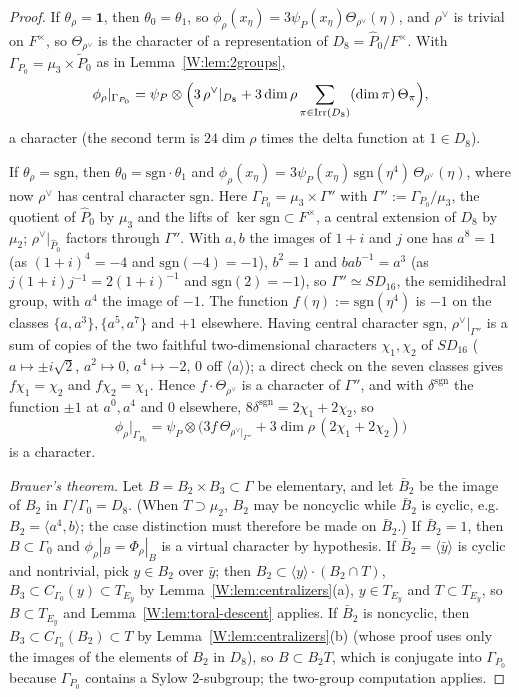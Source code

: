 \begin{proof}
If $\theta_\rho=\mathbf1$, then $\theta_0=\theta_1$, so
$\phi_\rho(x_\eta)=3\psi_P(x_\eta)\Theta_{\rho^\vee}(\eta)$, and
$\rho^\vee$ is trivial on $F^\times$, so $\Theta_{\rho^\vee}$ is the
character of a representation of $D_8=\hat P_0/F^\times$.  With
$\Gamma_{P_0}=\mu_3\times\tilde P_0$ as in Lemma~\ref{W:lem:2groups},
\[
 \phi_\rho|_{\Gamma_{P_0}}=\psi_P\otimes\Bigl(3\,\rho^\vee|_{D_8}+3\dim\rho\sum_{\pi\in\operatorname{Irr}(D_8)}(\dim\pi)\,\Theta_\pi\Bigr),
\]
a character (the second term is $24\dim\rho$ times the delta function at
$1\in D_8$).

If $\theta_\rho=\mathrm{sgn}$, then $\theta_0=\mathrm{sgn}\cdot\theta_1$ and
$\phi_\rho(x_\eta)=3\psi_P(x_\eta)\,\mathrm{sgn}(\eta^4)\,\Theta_{\rho^\vee}(\eta)$,
where now $\rho^\vee$ has central character $\mathrm{sgn}$.
Here $\Gamma_{P_0}=\mu_3\times\Gamma''$ with $\Gamma'':=\Gamma_{P_0}/\mu_3$,
the quotient of $\hat P_0$ by $\mu_3$ and the lifts of
$\ker\mathrm{sgn}\subset F^\times$, a central extension of $D_8$ by
$\mu_2$; $\rho^\vee|_{\hat P_0}$ factors through $\Gamma''$.  With $a,b$
the images of $1+i$ and $j$ one has $a^8=1$ (as $(1+i)^4=-4$ and
$\mathrm{sgn}(-4)=-1$), $b^2=1$ and $bab^{-1}=a^3$ (as
$j(1+i)j^{-1}=2(1+i)^{-1}$ and $\mathrm{sgn}(2)=-1$), so
$\Gamma''\simeq SD_{16}$, the semidihedral group, with $a^4$ the image of
$-1$.  The function $f(\eta):=\mathrm{sgn}(\eta^4)$ is $-1$ on the classes
$\{a,a^3\},\{a^5,a^7\}$ and $+1$ elsewhere.  Having central character
$\mathrm{sgn}$, $\rho^\vee|_{\Gamma''}$ is a sum of copies of the two
faithful two-dimensional characters $\chi_1,\chi_2$ of $SD_{16}$
($a\mapsto\pm i\sqrt2$, $a^2\mapsto0$, $a^4\mapsto-2$, $0$ off
$\langle a\rangle$); a direct check on the seven classes gives
$f\chi_1=\chi_2$ and $f\chi_2=\chi_1$.  Hence $f\cdot\Theta_{\rho^\vee}$
is a character of $\Gamma''$, and with $\delta^{\mathrm{sgn}}$ the
function $\pm1$ at $a^{0},a^4$ and $0$ elsewhere,
$8\delta^{\mathrm{sgn}}=2\chi_1+2\chi_2$, so
\[
 \phi_\rho|_{\Gamma_{P_0}}=\psi_P\otimes\bigl(3f\,\Theta_{\rho^\vee|_{\Gamma''}}+3\dim\rho\,(2\chi_1+2\chi_2)\bigr)
\]
is a character.

\emph{Brauer's theorem.}  Let $B=B_2\times B_3\subset\Gamma$ be elementary,
and let $\bar B_2$ be the image of $B_2$ in $\Gamma/\Gamma_0=D_8$.  (When
$T\supset\mu_2$, $B_2$ may be noncyclic while $\bar B_2$ is cyclic, e.g.\
$B_2=\langle a^4,b\rangle$; the case distinction must therefore be made
on $\bar B_2$.)  If $\bar B_2=1$, then $B\subset\Gamma_0$ and
$\phi_\rho|_B=\Phi_\rho|_B$ is a virtual character by hypothesis.  If
$\bar B_2=\langle\bar y\rangle$ is cyclic and nontrivial, pick $y\in B_2$
over $\bar y$; then $B_2\subset\langle y\rangle\cdot(B_2\cap T)$, $B_3\subset C_{\Gamma_0}(y)\subset T_{E_y}$
by Lemma~\ref{W:lem:centralizers}(a), $y\in T_{E_y}$ and $T\subset T_{E_y}$,
so $B\subset T_{E_y}$ and Lemma~\ref{W:lem:toral-descent} applies.  If
$\bar B_2$ is noncyclic, then $B_3\subset C_{\Gamma_0}(B_2)\subset T$ by
Lemma~\ref{W:lem:centralizers}(b) (whose proof uses only the images of the
elements of $B_2$ in $D_8$), so $B\subset B_2T$, which is conjugate into
$\Gamma_{P_0}$ because $\Gamma_{P_0}$ contains a Sylow $2$-subgroup; the
two-group computation applies.


\end{proof}
